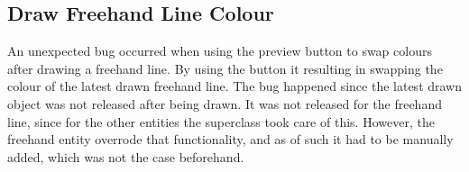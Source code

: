 \subsection{Draw Freehand Line Colour}
An unexpected bug occurred when using the preview button to swap colours after drawing a freehand line. 
By using the button it resulting in swapping the colour of the latest drawn freehand line. 
The bug happened since the latest drawn object was not released after being drawn.
It was not released for the freehand line, since for the other entities the superclass took care of this. 
However, the freehand entity overrode that functionality, and as of such it had to be manually added, which was not the case beforehand.

